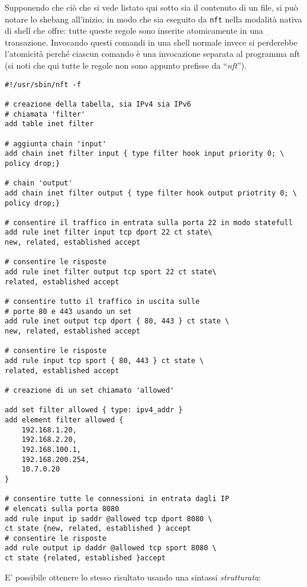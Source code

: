 Supponendo che ciò che si vede listato qui sotto sia il contenuto di un file,
si può notare lo shebang all'inizio, in modo che sia eseguito da \texttt{nft} nella
modalità nativa di shell che offre: tutte queste regole sono inserite atomicamente
in una transazione. Invocando questi comandi in una shell normale invece si
perderebbe l'atomicità perché ciascun comando è una invocazione separata al programma nft
(si noti che qui tutte le regole non sono appunto prefisse da ``\textit{nft}'').
\begin{verbatim}
#!/usr/sbin/nft -f
	
# creazione della tabella, sia IPv4 sia IPv6
# chiamata 'filter'
add table inet filter
	
# aggiunta chain 'input'
add chain inet filter input { type filter hook input priority 0; \
policy drop;}
	
# chain 'output'
add chain inet filter output { type filter hook output priotrity 0; \
policy drop;}
	
# consentire il traffico in entrata sulla porta 22 in modo statefull
add rule inet filter input tcp dport 22 ct state\
new, related, established accept
	
# consentire le risposte
add rule inet filter output tcp sport 22 ct state\
related, established accept
	
# consentire tutto il traffico in uscita sulle
# porte 80 e 443 usando un set
add rule inet output tcp dport { 80, 443 } ct state \
new, related, established accept
	
# consentire le risposte
add rule input tcp sport { 80, 443 } ct state \
related, established accept
	
# creazione di un set chiamato 'allowed'
	
add set filter allowed { type: ipv4_addr }
add element filter allowed {
	192.168.1.20,
	192.168.2.20,
	192.168.100.1,
	192.168.200.254,
	10.7.0.20
}
	
# consentire tutte le connessioni in entrata dagli IP
# elencati sulla porta 8080
add rule input ip saddr @allowed tcp dport 8080 \
ct state {new, related, established } accept
# consentire le risposte
add rule output ip daddr @allowed tcp sport 8080 \
ct state {related, established }accept
\end{verbatim}
E' possibile ottenere lo stesso risultato usando una sintassi \textit{strutturata}:
